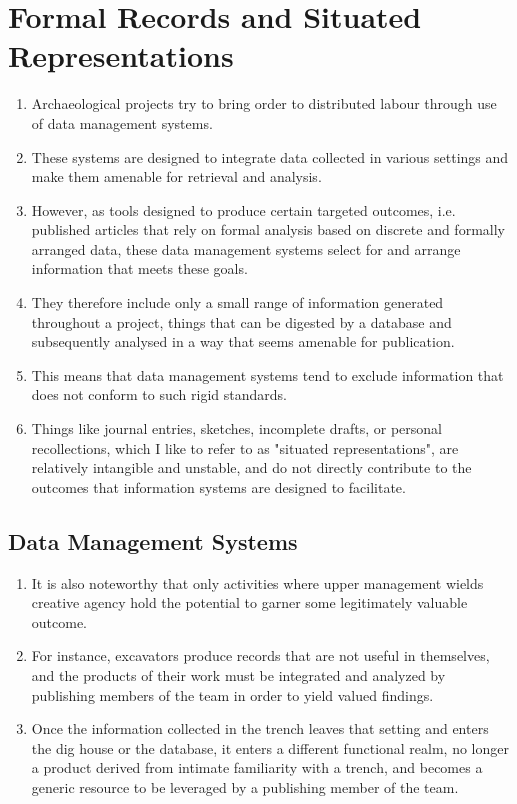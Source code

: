\documentclass{article}
\begin{document}
\section{Formal Records and Situated Representations}
\begin{enumerate}
  \item Archaeological projects try to bring order to distributed labour through use of data management systems.
  \item These systems are designed to integrate data collected in various settings and make them amenable for retrieval and analysis.
  \item However, as tools designed to produce certain targeted outcomes, i.e. published articles that rely on formal analysis based on discrete and formally arranged data, these data management systems select for and arrange information that meets these goals.
  \item They therefore include only a small range of information generated throughout a project, things that can be digested by a database and subsequently analysed in a way that seems amenable for publication.
  \item This means that data management systems tend to exclude information that does not conform to such rigid standards.
  \item Things like journal entries, sketches, incomplete drafts, or personal recollections, which I like to refer to as "situated representations", are relatively intangible and unstable, and do not directly contribute to the outcomes that information systems are designed to facilitate.
\end{enumerate}

\subsection{Data Management Systems}
\begin{enumerate}
  \item It is also noteworthy that only activities where upper management wields creative agency hold the potential to garner some legitimately valuable outcome.
  \item For instance, excavators produce records that are not useful in themselves, and the products of their work must be integrated and analyzed by publishing members of the team in order to yield valued findings.
  \item Once the information collected in the trench leaves that setting and enters the dig house or the database, it enters a different functional realm, no longer a product derived from intimate familiarity with a trench, and becomes a generic resource to be leveraged by a publishing member of the team.
\end{enumerate}
\end{document}
